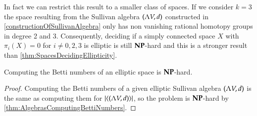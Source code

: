 \begin{Remark}
 In fact we can restrict this result to a smaller class of spaces. If we consider $k = 3$ the space resulting from
 the Sullivan algebra $(\Lambda V,d)$ constructed in \ref{constructionOfSullivanAlgebra} only has non vanishing rational
 homotopy groups in degree 2 and 3. Consequently, deciding if a simply connected space $X$ with
 $\pi_i(X) = 0$ for $i \neq 0,2,3$ is elliptic is still $\mathbf{NP}$-hard and this is a stronger result than
 \ref{thm:SpacesDecidingEllipticity}.
\end{Remark}

\begin{Theorem}
 Computing the Betti numbers of an elliptic space is $\mathbf{NP}$-hard.
\end{Theorem}

\begin{proof}
 Computing the Betti numbers of a given elliptic Sullivan algebra $(\Lambda V,d)$ is the same as computing
 them for $ | \langle (\Lambda V,d) \rangle |$, so the problem is $\mathbf{NP}$-hard by \ref{thm:AlgebrasComputingBettiNumbers}.
\end{proof}
